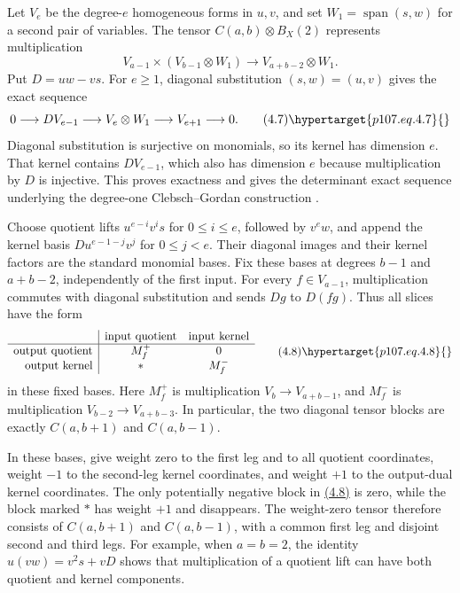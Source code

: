 \begin{amsthmproof}
Let $V_e$ be the degree-$e$ homogeneous forms in $u,v$, and set $W_1=\operatorname{span}(s,w)$ for a second pair of variables. The tensor $C(a,b)\otimes B_X(2)$ represents multiplication
\[
V_{a-1}\times(V_{b-1}\otimes W_1)\longrightarrow V_{a+b-2}\otimes W_1.
\]
Put $D=uw-vs$. For $e\ge1$, diagonal substitution $(s,w)=(u,v)$ gives the exact sequence
\begin{equation}
0\longrightarrow DV_{e-1}\longrightarrow V_e\otimes W_1\longrightarrow V_{e+1}\longrightarrow0.\tag{4.7}\hypertarget{p107.eq.4.7}{}
\end{equation}
Diagonal substitution is surjective on monomials, so its kernel has dimension $e$. That kernel contains $DV_{e-1}$, which also has dimension $e$ because multiplication by $D$ is injective. This proves exactness and gives the determinant exact sequence underlying the degree-one Clebsch--Gordan construction \cite[Section 2.6 of the author version]{r9}.

Choose quotient lifts $u^{e-i}v^i s$ for $0\le i\le e$, followed by $v^e w$, and append the kernel basis $Du^{e-1-j}v^j$ for $0\le j<e$. Their diagonal images and their kernel factors are the standard monomial bases. Fix these bases at degrees $b-1$ and $a+b-2$, independently of the first input. For every $f\in V_{a-1}$, multiplication commutes with diagonal substitution and sends $Dg$ to $D(fg)$. Thus all slices have the form
\begin{equation}
\begin{array}{r|cc}
 & \text{input quotient} & \text{input kernel}\\\hline
\text{output quotient} & M_f^+ & 0\\
\text{output kernel} & * & M_f^-
\end{array}\tag{4.8}\hypertarget{p107.eq.4.8}{}
\end{equation}
in these fixed bases. Here $M_f^+$ is multiplication $V_b\to V_{a+b-1}$, and $M_f^-$ is multiplication $V_{b-2}\to V_{a+b-3}$. In particular, the two diagonal tensor blocks are exactly $C(a,b+1)$ and $C(a,b-1)$.

In these bases, give weight zero to the first leg and to all quotient coordinates, weight $-1$ to the second-leg kernel coordinates, and weight $+1$ to the output-dual kernel coordinates. The only potentially negative block in \hyperlink{p107.eq.4.8}{(4.8)} is zero, while the block marked $*$ has weight $+1$ and disappears. The weight-zero tensor therefore consists of $C(a,b+1)$ and $C(a,b-1)$, with a common first leg and disjoint second and third legs. For example, when $a=b=2$, the identity $u(vw)=v^2s+vD$ shows that multiplication of a quotient lift can have both quotient and kernel components.


\end{amsthmproof}
